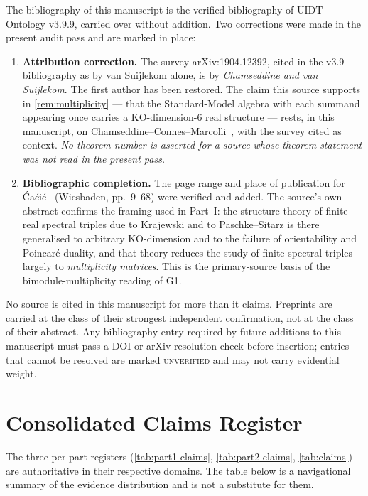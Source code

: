 \documentclass[12pt,a4paper,twoside]{article}
\theoremstyle{plain}
\theoremstyle{definition}
\theoremstyle{remark}
\begin{document}
\noindent The bibliography of this manuscript is the verified bibliography of
UIDT Ontology v3.9.9, carried over without addition. Two corrections
were made in the present audit pass and are marked in place:

\begin{enumerate}[leftmargin=1.6em,itemsep=0.25em]
\item \textbf{Attribution correction.} The survey arXiv:1904.12392,
cited in the v3.9 bibliography as by van Suijlekom alone, is by
\emph{Chamseddine and van Suijlekom}. The first author has been
restored. The claim this source supports in
\cref{rem:multiplicity} --- that the Standard-Model algebra with each
summand appearing once carries a KO-dimension-6 real structure ---
rests, in this manuscript, on Chamseddine--Connes--Marcolli~\cite{ccm2007},
with the survey cited as context. \emph{No theorem number is asserted
for a source whose theorem statement was not read in the present pass.}
\item \textbf{Bibliographic completion.} The page range and place of
publication for \'Ca\'ci\'c~\cite{cacic2011} (Wiesbaden, pp.~9--68) were
verified and added. The source's own abstract confirms the framing used
in Part~I: the structure theory of finite real spectral triples due to
Krajewski and to Paschke--Sitarz is there generalised to arbitrary
KO-dimension and to the failure of orientability and Poincar\'e duality,
and that theory reduces the study of finite spectral triples largely to
\emph{multiplicity matrices}. This is the primary-source basis of the
bimodule-multiplicity reading of G1.
\end{enumerate}

\noindent No source is cited in this manuscript for more than it claims.
Preprints are carried at the class of their strongest independent
confirmation, not at the class of their abstract. Any bibliography entry
required by future additions to this manuscript must pass a DOI or arXiv
resolution check before insertion; entries that cannot be resolved are
marked \textsc{unverified} and may not carry evidential weight.

\newpage
\section{Consolidated Claims Register}
\label{sec:consolidated-claims}

\noindent The three per-part registers (\cref{tab:part1-claims},
\cref{tab:part2-claims}, \cref{tab:claims}) are authoritative in their
respective domains. The table below is a navigational summary of the
evidence distribution and is not a substitute for them.
\end{document}
